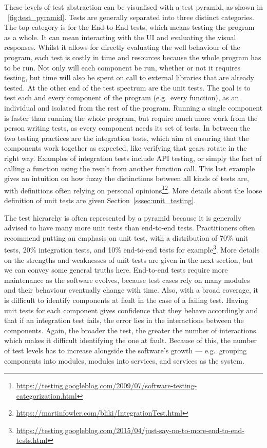 \documentclass[a4paper,11pt]{sdm_internship}
\theoremstyle{definition}
\begin{document}
These levels of test abstraction can be visualised with a test pyramid, as shown in \figurename~\ref{fig:test_pyramid}.
Tests are generally separated into three distinct categories.
The top category is for the End-to-End tests, which means testing the program as a whole.
It can mean interacting with the UI and evaluating the visual responses.
Whilst it allows for directly evaluating the well behaviour of the program, each test is costly in time and resources because the whole program has to be run.
Not only will each component be run, whether or not it requires testing, but time will also be spent on call to external libraries that are already tested.
At the other end of the test spectrum are the unit tests.
The goal is to test each and every component of the program (e.g.\ every function), as an individual and isolated from the rest of the program.
Running a single component is faster than running the whole program, but require much more work from the person writing tests, as every component needs its set of tests.
In between the two testing practices are the integration tests, which aim at ensuring that the components work together as expected, like verifying that gears rotate in the right way.
Examples of integration tests include API testing, or simply the fact of calling a function using the result from another function call.
This last example gives an intuition on how fuzzy the distinctions between all kinds of tests are, with definitions often relying on personal opinions\footnote{\url{https://testing.googleblog.com/2009/07/software-testing-categorization.html}}\footnote{\url{https://martinfowler.com/bliki/IntegrationTest.html}}.
More details about the loose definition of unit tests are given Section~\ref{sssec:unit_testing}.

The test hierarchy is often represented by a pyramid because it is generally advised to have many more unit tests than end-to-end tests.
Practitioners often recommend putting an emphasis on unit test, with a distribution of 70\% unit tests, 20\% integration tests, and 10\% end-to-end tests for example\footnote{\url{https://testing.googleblog.com/2015/04/just-say-no-to-more-end-to-end-tests.html}}.
More details on the strengths and weaknesses of unit tests are given in the next section, but we can convey some general truths here.
End-to-end tests require more maintenance as the software evolves, because test cases rely on many modules and their behaviour eventually change with time.
Also, with a broad coverage, it is difficult to identify components at fault in the case of a failing test.
Having unit tests for each component gives confidence that they behave accordingly and that if an integration test fails, the error lies in the interactions between the components.
Again, the broader the test, the greater the number of interactions which makes it difficult identifying the one at fault.
Because of this, the number of test levels has to increase alongside the software's growth --- e.g.\ grouping components into modules, modules into services, and services as the system.
\end{document}
